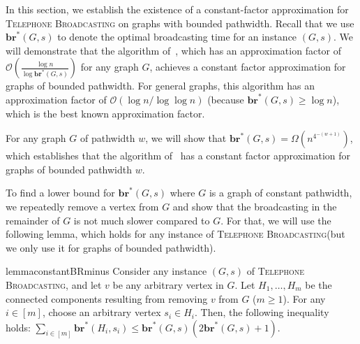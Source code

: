 \documentclass[letterpaper,11pt]{article}
\newcommand{\bropt}{{\boldsymbol{br}^*}}
\newcommand{\oh}{\mathcal{O}}
\newcommand{\telebr}{\textsc{Telephone Broadcasting}\xspace}
\newcommand{\pwidth}{w}
\begin{document}
In this section, we establish the existence of a constant-factor approximation for \telebr on graphs with bounded pathwidth. Recall that we use $\bropt(G,s)$
to denote the optimal broadcasting time for an instance $(G,s)$. We will demonstrate that the algorithm of~\citet{elkin2006sublogarithmic}, which has an approximation factor of $\oh\left(\frac{\log n}{\log \bropt(G, s)}\right)$ for any graph $G$, achieves a constant factor approximation for graphs of bounded pathwidth. For general graphs, this algorithm has an approximation factor of $\oh(\log n/ \log \log n)$ (because $\bropt(G,s)\geq  \log n$), which is the best known approximation factor.  

For any graph $G$ of pathwidth $\pwidth$, we will show that $\bropt(G,s) = \Omega(n^{4^{-(\pwidth+1)}})$, which establishes that the algorithm of~\citet{elkin2006sublogarithmic} has a constant factor approximation for graphs of bounded pathwidth $\pwidth$.



To find a lower bound for $\bropt(G,s)$ where $G$ is a graph of constant pathwidth, we repeatedly remove a vertex from $G$ and show that the broadcasting in the remainder of $G$ is not much slower compared to $G$. For that, we will use the following lemma, which holds for any instance of \telebr (but we only use it for graphs of bounded pathwidth). 

\begin{restatable}{lemma}{constantBRminus}\label{lemma:brminus}
Consider any instance $(G,s)$ of \telebr, and let $v$ be any arbitrary vertex in $G$. Let $H_1,\ldots, H_m$ be the connected components resulting from removing $v$ from $G$ ($m\geq 1$). 
For any $i \in [m]$, choose an arbitrary vertex $s_i\in H_i$.
Then, the following inequality holds: $\sum_{i\in[m]} \bropt(H_i, s_i) \leq \bropt(G,s)(2\bropt(G,s) + 1)$.
\end{restatable}
\end{document}
